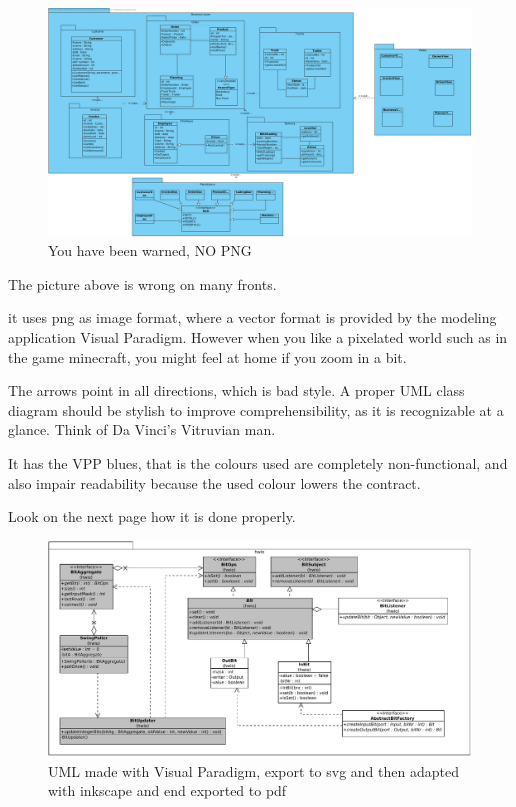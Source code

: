 \begin{figure}[htbp]
  \includegraphics[width=\linewidth]{images/ClassDiagram1.png}
  \caption{You have been warned, NO PNG}
\end{figure}

The picture above is wrong on many fronts.
\begin{Itemize}
\item it uses png as image format, where a vector format is provided by the modeling application Visual Paradigm.
  However when you like a pixelated world such as in the game \gls{minecraft}, you might feel at home if you zoom in a bit.
\item The arrows point in all directions, which is bad style. A proper UML class diagram should be stylish to improve comprehensibility, as it is recognizable at a glance. Think of Da Vinci's Vitruvian man.
\item It has the VPP blues, that is the colours used are completely non-functional, and also impair readability because the used colour lowers the contract.
\end{Itemize}

Look on the next page how it is done properly.

\begin{figure}
  \includegraphics[width=\linewidth]{images/HWIO.pdf}
	\caption{UML made with Visual Paradigm, export to svg and then adapted with inkscape and end exported to pdf}
\end{figure}


